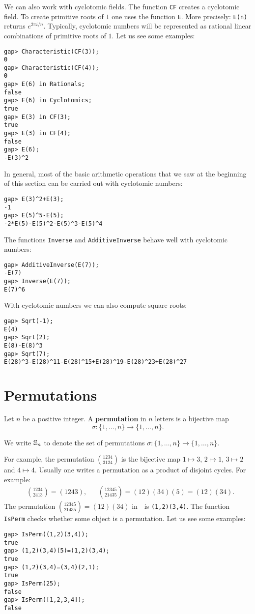 We can also work with cyclotomic fields. The function  \lstinline{CF} creates a cyclotomic
field. To create primitive roots of $1$ one uses the function \lstinline{E}.
More precisely: \lstinline{E(n)} returns $e^{2\pi i/n}$. Typically, cyclotomic
numbers will be represented as rational linear combinations of primitive roots
of $1$. Let us see some examples:
\begin{lstlisting}
gap> Characteristic(CF(3));
0
gap> Characteristic(CF(4));
0
gap> E(6) in Rationals;
false 
gap> E(6) in Cyclotomics;
true
gap> E(3) in CF(3);
true
gap> E(3) in CF(4);
false
gap> E(6);
-E(3)^2
\end{lstlisting}

In general, most of the basic arithmetic operations that we saw at the beginning of this section can be carried out with cyclotomic numbers:
\begin{lstlisting}
gap> E(3)^2+E(3);
-1
gap> E(5)^5-E(5);
-2*E(5)-E(5)^2-E(5)^3-E(5)^4
\end{lstlisting}
The functions \lstinline{Inverse} and \lstinline{AdditiveInverse} behave well
with cyclotomic numbers:
\begin{lstlisting}
gap> AdditiveInverse(E(7));
-E(7)
gap> Inverse(E(7));
E(7)^6
\end{lstlisting}
With cyclotomic numbers we can also compute square roots:
\begin{lstlisting}
gap> Sqrt(-1);
E(4)
gap> Sqrt(2);
E(8)-E(8)^3
gap> Sqrt(7);
E(28)^3-E(28)^11-E(28)^15+E(28)^19-E(28)^23+E(28)^27
\end{lstlisting}

\section{Permutations}
\label{permutations}

Let $n$ be a positive integer. A \textbf{permutation} in $n$ letters is a bijective map
\[
\sigma\colon\{1,\dots,n\}\to\{1,\dots,n\}.
\]

We write $\mathbb{S}_n$ to denote the set of permutations $\sigma\colon\{1,\dots,n\}\to\{1,\dots,n\}$.

For example, the permutation
$\binom{1234}{3124}$ is the bijective map $1\mapsto 3$, $2\mapsto 1$,
$3\mapsto 2$ and $4\mapsto 4$. 
Usually one writes a permutation as a product of disjoint cycles. For example:
\begin{align*}
&\binom{1234}{2413}=(1243),
&&\binom{12345}{21435}=(12)(34)(5)=(12)(34).
\end{align*}
The permutation $\binom{12345}{21435}=(12)(34)$ in~\GAP~is 
\lstinline{(1,2)(3,4)}.  The function \lstinline{IsPerm} checks whether 
some object is a permutation. Let us see some examples:
\begin{lstlisting}
gap> IsPerm((1,2)(3,4));
true
gap> (1,2)(3,4)(5)=(1,2)(3,4);
true
gap> (1,2)(3,4)=(3,4)(2,1);
true
gap> IsPerm(25);
false
gap> IsPerm([1,2,3,4]);
false
\end{lstlisting}

